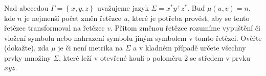 \subsubsection{}
Nad abecedou $\Gamma =\left \{ x,y,z \right \}$ uvažujeme jazyk
$\Sigma=x^{*}y^{+}z^{*}$. Buď $\mu (u,v)=n$, kde $n$ je nejmenší počet změn
řetězce $u$, které je potřeba provést, aby se tento řetězec transformoval na
řetězec $v$. Přitom změnou řetězce rozumíme vypuštění či vložení symbolu nebo
nahrazení symbolu jiným symbolem v tomto řetězci. Ověřte (dokažte), zda $\mu$ je
či není metrika na $\Sigma$ a v kladném případě určete všechny prvky množiny
$\Sigma$, které leží v otevřené kouli o poloměru 2 se středem v prvku $xyz$.
